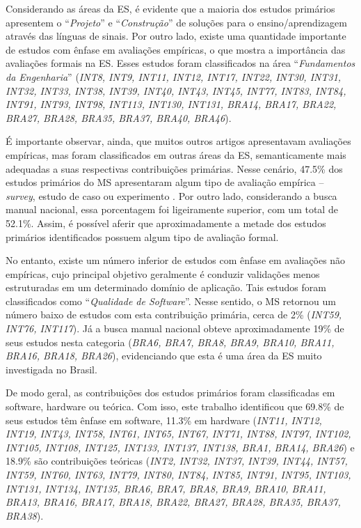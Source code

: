Considerando as áreas da ES, é evidente que a maioria dos estudos primários apresentem o ``\textit{Projeto}'' e ``\textit{Construção}'' de soluções para o ensino/aprendizagem através das línguas de sinais. Por outro lado, existe uma quantidade importante de estudos com ênfase em avaliações empíricas, o que mostra a importância das avaliações formais na ES. Esses estudos foram classificados na área ``\textit{Fundamentos da Engenharia}'' (\textit{INT8, INT9, INT11, INT12, INT17, INT22, INT30, INT31, INT32, INT33, INT38, INT39, INT40, INT43, INT45, INT77, INT83, INT84, INT91, INT93, INT98, INT113, INT130, INT131, BRA14, BRA17, BRA22, BRA27, BRA28, BRA35, BRA37, BRA40, BRA46}).

É importante observar, ainda, que muitos outros artigos apresentavam avaliações empíricas, mas foram classificados em outras áreas da ES, semanticamente mais adequadas a suas respectivas contribuições primárias. Nesse cenário, 47.5\% dos estudos primários do MS apresentaram algum tipo de avaliação empírica -- \textit{survey}, estudo de caso ou experimento \cite{Wohlin2012}. Por outro lado, considerando a busca manual nacional, essa porcentagem foi ligeiramente superior, com um total de 52.1\%. Assim, é possível aferir que aproximadamente a metade dos estudos primários identificados possuem algum tipo de avaliação formal.

No entanto, existe um número inferior de estudos com ênfase em avaliações não empíricas, cujo principal objetivo geralmente é conduzir validações menos estruturadas em um determinado domínio de aplicação. Tais estudos foram classificados como ``\textit{Qualidade de Software}''. Nesse sentido, o MS retornou um número baixo de estudos com esta contribuição primária, cerca de 2\% (\textit{INT59, INT76, INT117}). Já a busca manual nacional obteve aproximadamente 19\% de seus estudos nesta categoria (\textit{BRA6, BRA7, BRA8, BRA9, BRA10, BRA11, BRA16, BRA18, BRA26}), evidenciando que esta é uma área da ES muito investigada no Brasil. 

De modo geral, as contribuições dos estudos primários foram classificadas em software, hardware ou teórica. Com isso, este trabalho identificou que 69.8\% de seus estudos têm ênfase em software, 11.3\% em hardware (\textit{INT11, INT12, INT19, INT43, INT58, INT61, INT65, INT67, INT71, INT88, INT97, INT102, INT105, INT108, INT125, INT133, INT137, INT138, BRA1, BRA14, BRA26}) e 18.9\% são contribuições teóricas (\textit{INT2, INT32, INT37, INT39, INT44, INT57, INT59, INT60, INT63, INT79, INT80, INT84, INT85, INT91, INT95, INT103, INT131, INT134, INT135, BRA6, BRA7, BRA8, BRA9, BRA10, BRA11, BRA13, BRA16, BRA17, BRA18, BRA22, BRA27, BRA28, BRA35, BRA37, BRA38}).

